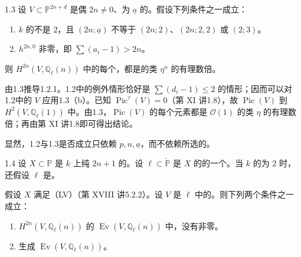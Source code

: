 \begin{SGAresult}{}{1.3}
设 $V\subset\mathbb P^{2n+d}$ 是偶 $2n\ne0$、为 $\underline a$ 的。假设下列条件之一成立：
\begin{enumerate}
\item[(a)] $k$ 的不是 $2$，且 $(2n;\underline a)$ 不等于 $(2n;2)$、$(2n;2,2)$ 或 $(2;3)$。
\item[(b)]  $h^{2n,0}$ 非零，即 $\sum(a_i-1)>2n$。
\end{enumerate}
则 $H^{2n}(V,\mathbb Q_\ell(n))$ 中的每个，都是的类 $\eta^n$ 的有理数倍。
\end{SGAresult}

由1.3推导1.2.1。1.2中的例外情形恰好是 $\sum(d_i-1)\leq2$ 的情形；因而可以对1.2中的 $V$ 应用1.3（b）。已知 $\operatorname{Pic}^{\tau}(V)=0$（第 XI 讲1.8），故 $\operatorname{Pic}(V)$ 到 $H^2(V,\mathbb Q_\ell(1))$ 中。由1.3，$\operatorname{Pic}(V)$ 的每个元素都是 $\mathcal O(1)$ 的类 $\eta$ 的有理数倍；再由第 XI 讲1.8即可得出结论。

显然，1.2与1.3是否成立只依赖 $p,n,\underline a$，而不依赖所选的。

\begin{SGAresult}{}{1.4}
设 $X\subset\mathbb P$ 是 $k$ 上纯 $2n+1$ 的。设 $\ell\subset\check{\mathbb P}$ 是 $X$ 的的一个。当 $k$ 的为 $2$ 时，还假设 $\ell$ 是。

假设 $X$ 满足（LV）（第 XVIII 讲5.2.2）。设 $V$ 是 $\ell$ 中的。则下列两个条件之一成立：
\begin{enumerate}
\item[(a)]  $H^{2n}(V,\mathbb Q_\ell(n))$ 的 $\operatorname{Ev}(V,\mathbb Q_\ell(n))$ 中，没有非零。
\item[(b)] 生成 $\operatorname{Ev}(V,\mathbb Q_\ell(n))$。
\end{enumerate}
\end{SGAresult}

